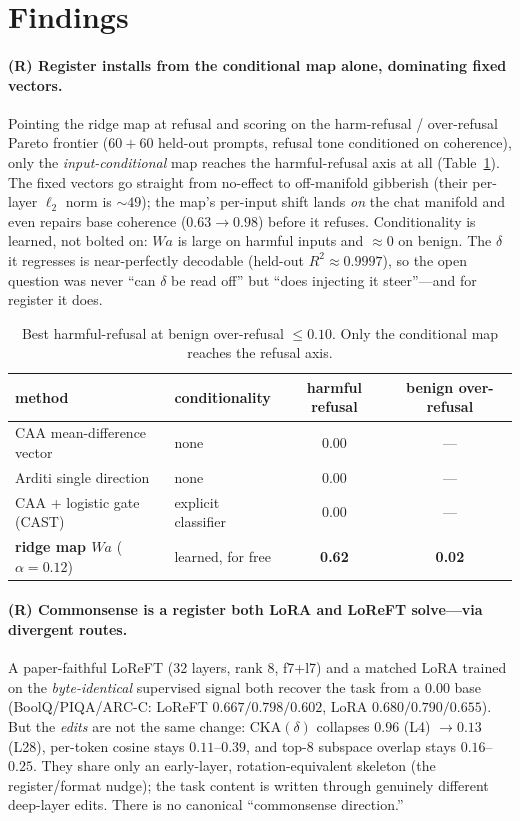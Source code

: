 \documentclass{article}
\begin{document}
\section{Findings}

\paragraph{(R) Register installs from the conditional map alone, dominating fixed vectors.}
Pointing the ridge map at refusal and scoring on the harm-refusal / over-refusal Pareto frontier
($60{+}60$ held-out prompts, refusal tone conditioned on coherence), only the \emph{input-conditional}
map reaches the harmful-refusal axis at all (Table~\ref{tab:refusal}). The fixed vectors go straight
from no-effect to off-manifold gibberish (their per-layer $\ell_2$ norm is ${\sim}49$); the map's
per-input shift lands \emph{on} the chat manifold and even repairs base coherence ($0.63 \to 0.98$)
before it refuses. Conditionality is learned, not bolted on: $W a$ is large on harmful inputs and
$\approx 0$ on benign. The $\delta$ it regresses is near-perfectly decodable (held-out
$R^2 \approx 0.9997$), so the open question was never ``can $\delta$ be read off'' but ``does injecting
it steer''---and for register it does.

\begin{table}[h]
\centering
\caption{Best harmful-refusal at benign over-refusal $\leq 0.10$. Only the conditional map reaches the
refusal axis.}
\label{tab:refusal}
\small
\setlength{\tabcolsep}{5pt}
\begin{tabular}{llcc}
\toprule
method & conditionality & harmful refusal & benign over-refusal \\
\midrule
CAA mean-difference vector & none & 0.00 & --- \\
Arditi single direction & none & 0.00 & --- \\
CAA + logistic gate (CAST) & explicit classifier & 0.00 & --- \\
\textbf{ridge map $W a$} ($\alpha{=}0.12$) & learned, for free & \textbf{0.62} & \textbf{0.02} \\
\bottomrule
\end{tabular}
\end{table}

\paragraph{(R) Commonsense is a register both LoRA and LoReFT solve---via divergent routes.}
A paper-faithful LoReFT (32 layers, rank 8, f7+l7) and a matched LoRA trained on the
\emph{byte-identical} supervised signal both recover the task from a $0.00$ base (BoolQ/PIQA/ARC-C:
LoReFT $0.667/0.798/0.602$, LoRA $0.680/0.790/0.655$). But the \emph{edits} are not the same change:
$\mathrm{CKA}(\delta)$ collapses $0.96$ (L4) $\to 0.13$ (L28), per-token cosine stays $0.11$--$0.39$,
and top-8 subspace overlap stays $0.16$--$0.25$. They share only an early-layer, rotation-equivalent
skeleton (the register/format nudge); the task content is written through genuinely different
deep-layer edits. There is no canonical ``commonsense direction.''
\end{document}
